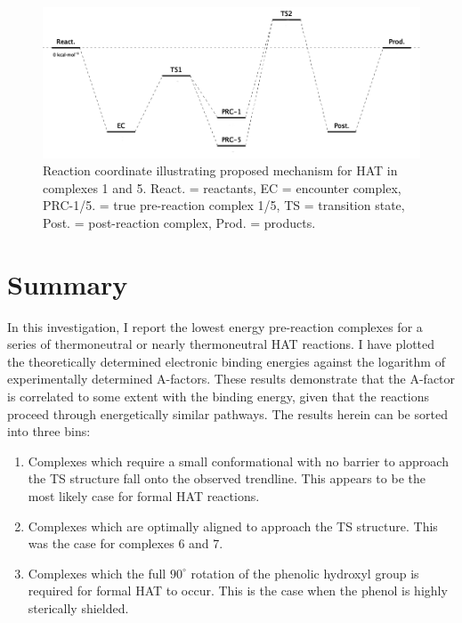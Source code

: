 
\begin{figure}[!htbp]
  \centering
  \includegraphics[width=\textwidth]{figures/encounter-pes.png}
  \caption[Reaction coordinate illustrating proposed mechanism for HAT in complexes 1 and 5.]{Reaction coordinate illustrating proposed mechanism for HAT in complexes 1 and 5. React. = reactants, EC = encounter complex, PRC-1/5. = true pre-reaction complex 1/5, TS = transition state, Post. = post-reaction complex, Prod. = products.}
\label{fig:encounter-pes}
\end{figure}


\section{Summary}
In this investigation, I report the lowest energy pre-reaction complexes for a series of thermoneutral or nearly thermoneutral HAT reactions. I have plotted the theoretically determined electronic binding energies against the logarithm of experimentally determined A-factors. These results demonstrate that the A-factor is correlated to some extent with the binding energy, given that the reactions proceed through energetically similar pathways. The results herein can be sorted into three bins:

\begin{enumerate}
  \item Complexes which require a small conformational with no barrier to approach the TS structure fall onto the observed trendline. This appears to be the most likely case for formal HAT reactions.

  \item Complexes which are optimally aligned to approach the TS structure. This was the case for complexes 6 and 7.

  \item Complexes which the full $90^\circ$ rotation of the phenolic hydroxyl group is required for formal HAT to occur. This is the case when the phenol is highly sterically shielded.
\end{enumerate}

